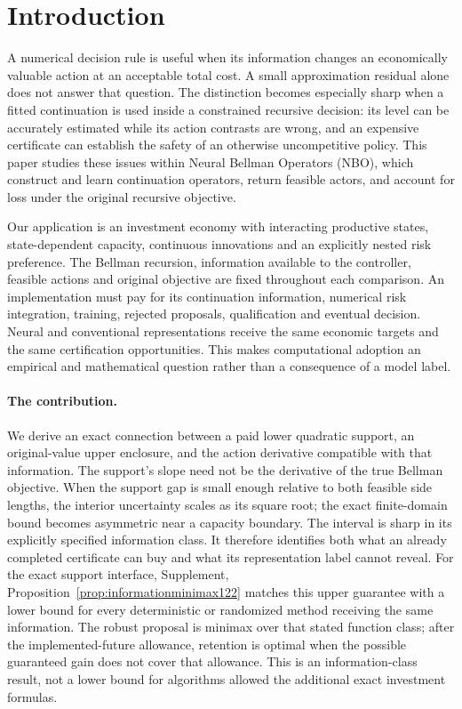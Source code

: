 \section{Introduction}\label{sec:introduction122}
A numerical decision rule is useful when its information changes an economically
valuable action at an acceptable total cost. A small approximation residual
alone does not answer that question. The distinction becomes especially sharp
when a fitted continuation is used inside a constrained recursive decision:
its level can be accurately estimated while its action contrasts are wrong,
and an expensive certificate can establish the safety of an otherwise
uncompetitive policy. This paper studies these issues within Neural Bellman
Operators (NBO), which construct and learn continuation operators, return
feasible actors, and account for loss under the original recursive objective.

Our application is an investment economy with interacting productive states,
state-dependent capacity, continuous innovations and an explicitly nested
risk preference. The Bellman recursion, information available to the controller,
feasible actions and original objective are fixed throughout each comparison.
An implementation must pay for its continuation information, numerical risk
integration, training, rejected proposals, qualification and eventual decision.
Neural and conventional representations receive the same economic targets and
the same certification opportunities. This makes computational adoption an
empirical and mathematical question rather than a consequence of a model label.

\paragraph{The contribution.}
We derive an exact connection between a paid lower quadratic support, an
original-value upper enclosure, and the action derivative compatible with that
information. The support's slope need not be the derivative of the true Bellman
objective. When the support gap is small enough relative to both feasible side lengths,
the interior uncertainty scales as its square root; the exact finite-domain
bound becomes asymmetric near a capacity boundary.
The interval is sharp in its explicitly specified information class. It
therefore identifies both what an already completed certificate can buy and
what its representation label cannot reveal. For the exact support interface,
Supplement, Proposition~\ref{prop:informationminimax122} matches this upper
guarantee with a lower bound for every deterministic or randomized method
receiving the same information. The robust proposal is minimax over that
stated function class; after the implemented-future allowance, retention is
optimal when the possible guaranteed gain does not cover that allowance.
This is an information-class result, not a lower bound for algorithms allowed
the additional exact investment formulas.

